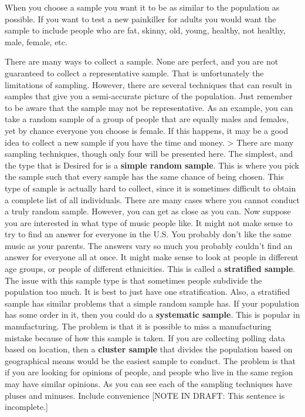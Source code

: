 \documentclass[]{book}
\begin{document}
When you choose a sample you want it to be as similar to the population as possible. If you want to test a new painkiller for adults you would want the sample to include people who are fat, skinny, old, young, healthy, not healthy, male, female, etc.

There are many ways to collect a sample. None are perfect, and you are not guaranteed to collect a representative sample. That is unfortunately the limitations of sampling. However, there are several techniques that can result in samples that give you a semi-accurate picture of the population. Just remember to be aware that the sample may not be representative. As an example, you can take a random sample of a group of people that are equally males and females, yet by chance everyone you choose is female. If this happens, it may be a good idea to collect a new sample if you have the time and money.
\textgreater{} There are many sampling techniques, though only four will be presented here. The simplest, and the type that is Desired for is a \textbf{simple random sample}. This is where you pick the sample such that every sample has the same chance of being chosen. This type of sample is actually hard to collect, since it is sometimes difficult to obtain a complete list of all individuals. There are many cases where you cannot conduct a truly random sample. However, you can get as close as you can. Now suppose you are interested in what type of music people like. It might not make sense to try to find an answer for everyone in the U.S. You probably don't like the same music as your parents. The answers vary so much you probably couldn't find an answer for everyone all at once. It might make sense to look at people in different age groups, or people of different ethnicities. This is called a \textbf{stratified sample}. The issue with this sample type is that sometimes people subdivide the population too much. It is best to just have one stratification. Also, a stratified sample has similar problems that a simple random sample has. If your population has some order in it, then you could do a \textbf{systematic sample}. This is popular in manufacturing. The problem is that it is possible to miss a manufacturing mistake because of how this sample is taken. If you are collecting polling data based on location, then a \textbf{cluster sample} that divides the population based on geographical means would be the easiest sample to conduct. The problem is that if you are looking for opinions of people, and people who live in the same region may have similar opinions. As you can see each of the sampling techniques have pluses and minuses. Include convenience {[}NOTE IN DRAFT: This sentence is incomplete.{]}
\end{document}
